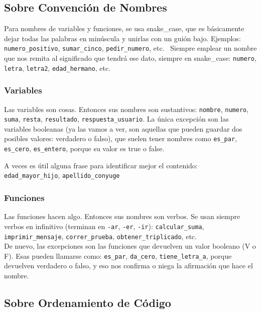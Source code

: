 \documentclass[
  letterpaper,
  DIV=11,
  numbers=noendperiod]{scrreprt}
\begin{document}
\subsection{Sobre Convención de
Nombres}\label{sobre-convenciuxf3n-de-nombres}

Para nombres de variables y funciones, se usa snake\_case, que es
básicamente dejar todas las palabras en minúscula y unirlas con un guión
bajo. Ejemplos: \texttt{numero\_positivo}, \texttt{sumar\_cinco},
\texttt{pedir\_numero}, etc.~ Siempre emplear un nombre que nos remita
al significado que tendrá ese dato, siempre en snake\_case:
\texttt{numero}, \texttt{letra}, \texttt{letra2},
\texttt{edad\_hermano}, etc.

\subsubsection{Variables}\label{variables-1}

Las variables son cosas. Entonces sus nombres son sustantivos:
\texttt{nombre}, \texttt{numero}, \texttt{suma}, \texttt{resta},
\texttt{resultado}, \texttt{respuesta\_usuario}. La única excepción son
las variables booleanas (ya las vamos a ver, son aquellas que pueden
guardar dos posibles valores: verdadero o falso), que suelen tener
nombres como \texttt{es\_par}, \texttt{es\_cero}, \texttt{es\_entero},
porque su valor es true o false.

A veces es útil alguna frase para identificar mejor el contenido:\\
\texttt{edad\_mayor\_hijo}, \texttt{apellido\_conyuge}

\subsubsection{Funciones}\label{funciones-1}

Las funciones hacen algo. Entonces sus nombres son verbos. Se usan
siempre verbos en infinitivo (terminan en \texttt{-ar}, \texttt{-er},
\texttt{-ir}): \texttt{calcular\_suma}, \texttt{imprimir\_mensaje},
\texttt{correr\_prueba}, \texttt{obtener\_triplicado}, etc.\\
De nuevo, las excepciones son las funciones que devuelven un valor
booleano (V o F). Esas pueden llamarse como: \texttt{es\_par},
\texttt{da\_cero}, \texttt{tiene\_letra\_a}, porque devuelven verdadero
o falso, y eso nos confirma o niega la afirmación que hace el nombre.

\subsection{Sobre Ordenamiento de
Código}\label{sobre-ordenamiento-de-cuxf3digo}
\end{document}
